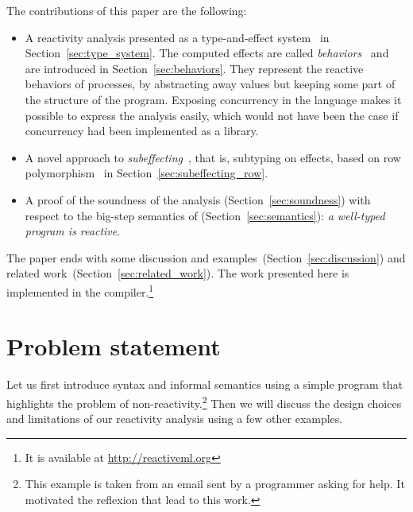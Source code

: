 \documentclass[9pt,preprint]{sigplanconf}
\begin{document}

The contributions of this paper are the following:
\begin{itemize}
\item A reactivity analysis presented as a type-and-effect system~\cite{Lucassen:1988} in Section~\ref{sec:type_system}. The computed effects are called \emph{behaviors}~\cite{Amtoft:1999} and are introduced in Section~\ref{sec:behaviors}. They represent the reactive behaviors of processes, by abstracting away values but keeping some part of the structure of the program. Exposing concurrency in the language makes it possible to express the analysis easily, which would not have been the case if concurrency had been implemented as a library.
\item A novel approach to \emph{subeffecting}~\cite{Nielson:1999}, that is, subtyping on effects, based on row polymorphism~\cite{Remy:1993} in Section~\ref{sec:subeffecting_row}.
\item A proof of the soundness of the analysis (Section~\ref{sec:soundness}) with respect to the big-step semantics of \rml (Section~\ref{sec:semantics}): \emph{a well-typed program is reactive}.
\end{itemize}

The paper ends with some discussion and examples~(Section~\ref{sec:discussion}) and related work~(Section~\ref{sec:related_work}). The work presented here is implemented in the \rml compiler.\footnote{It is available at \url{http://reactiveml.org}}

\clearpage

\section{Problem statement}
\label{sec:problem}

Let us first introduce \rml{} syntax and informal semantics using a simple program that highlights the problem of non-reactivity.\footnote{This example is taken from an email sent by a \rml programmer asking for help. It motivated the reflexion that lead to this work.} Then we will discuss the design choices and limitations of our reactivity analysis using a few other examples.
\end{document}
